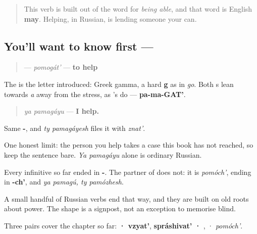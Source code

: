 \label{lesson:RU-C05-pomogat}



\begin{quote}
This verb is built out of the word for \emph{being able}, and that word is English \textbf{may}. Helping, in Russian, is lending someone your can.
\end{quote}

\subsection*{You'll want to know first — }
\begin{quote}
\textbf{} — \emph{pomogát'} — \textbf{to help}
\end{quote}

The \textbf{} is the letter \emph{} introduced: Greek gamma, a hard \textbf{g} as in \emph{go}. Both \textbf{}s lean towards \emph{a} away from the stress, as \emph{}'s do — \textbf{pa-ma-GAT'}.

\begin{quote}
\emph{ya pamagáyu} — \textbf{I help.}
\end{quote}

Same \textbf{-}, and \emph{ty pamagáyesh} files it with \emph{znat'}.

One honest limit: the person you help takes a case this book has not reached, so keep the sentence bare. \emph{Ya pamagáyu} alone is ordinary Russian.

\begin{grammarlens}[title={Grammar Lens: a partner that does not end in -\ru{ть}}]
Every infinitive so far ended in \textbf{-}. The partner of \emph{} does not: it is \emph{pomóch'}, ending in \textbf{-ch'}, and \emph{ya pamagú, ty pamózhesh}.

A small handful of Russian verbs end that way, and they are built on old roots about power. The shape is a signpost, not an exception to memorise blind.

Three pairs cover the chapter so far: \textbf{ · vzyat'}, \textbf{spráshivat' · }, \textbf{} · \emph{pomóch'}.
\end{grammarlens}

